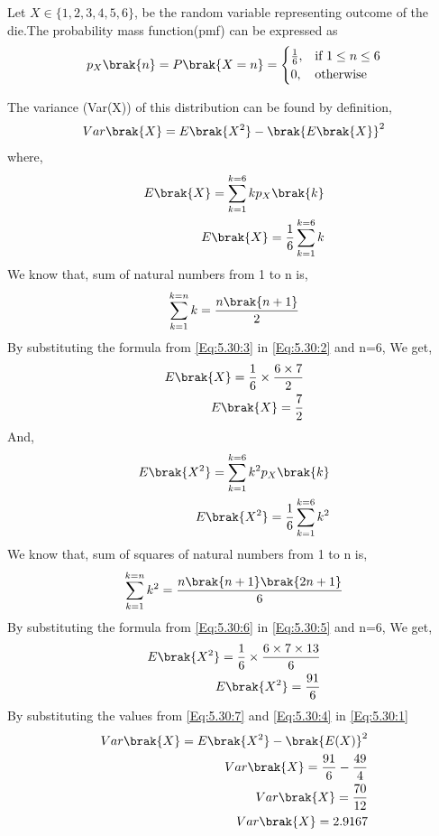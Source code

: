 Let $X \in \{1,2,3,4,5,6\}$, be the random variable representing outcome of the die.The probability mass function(pmf) can be expressed as
\begin{align}
p_X\brak{n} = P\brak{X=n} =  \begin{cases}
			\frac{1}{6}, & \text{if $1 \leq n\leq 6$}\\
            0, & \text{otherwise}
		 \end{cases} 
\end{align}



		              
The variance (Var(X)) of this distribution can be found by definition,\\
\begin{align}
Var\brak{X} = E\brak{X^{2}}-\brak{E\brak{X}}^{2} \label{Eq:5.30:1}
\end{align}
where,
\begin{align}
E\brak{X}=\sum_{k=1}^{k=6} kp_X\brak{k}  \\
E\brak{X}=\frac{1}{6}\sum_{k=1}^{k=6} k \label{Eq:5.30:2}
\end{align}
We know that, sum of natural numbers from 1 to n is,
\begin{align}
\sum_{k=1}^{k=n} k = \frac{n\brak{n+1}}{2} \label{Eq:5.30:3}
\end{align}
By substituting the formula from \eqref{Eq:5.30:3} in \eqref{Eq:5.30:2} and n=6, We get,
\begin{align}
E\brak{X}=\frac{1}{6} \times \frac{6\times7}{2}  \\
E\brak{X}=\frac{7}{2} \label{Eq:5.30:4}
\end{align}
And,
\begin{align}
E\brak{X^{2}}=\sum_{k=1}^{k=6} k^{2}p_X\brak{k}  \\
E\brak{X^{2}}=\frac{1}{6}\sum_{k=1}^{k=6} k^{2} \label{Eq:5.30:5}
\end{align}
We know that, sum of squares of natural numbers from 1 to n is,
\begin{align}
\sum_{k=1}^{k=n} k^{2} = \frac{n\brak{n+1}\brak{2n+1}}{6} \label{Eq:5.30:6}
\end{align}
By substituting the formula from \eqref{Eq:5.30:6} in \eqref{Eq:5.30:5} and n=6, We get,
\begin{align}
E\brak{X^{2}}=\frac{1}{6} \times \frac{6\times7\times13}{6}  \\
E\brak{X^{2}}=\frac{91}{6} \label{Eq:5.30:7}
\end{align}
By substituting the values from \eqref{Eq:5.30:7} and \eqref{Eq:5.30:4} in \eqref{Eq:5.30:1}
\begin{align}
Var\brak{X} = E\brak{X^{2}}-\brak{E(X)}^{2}  \\
Var\brak{X} = \frac{91}{6} - \frac{49}{4}  \\
Var\brak{X} = \frac{70}{12}  \\
Var\brak{X} = 2.9167 \label{Eq:5.30:8}
\end{align}